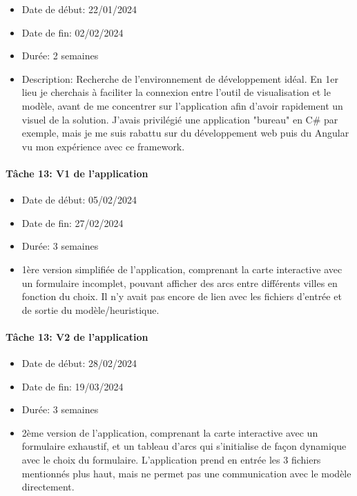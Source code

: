 \documentclass{polytech/polytech}
\numberwithin{figure}{chapter}
\begin{document}
\begin{appendix}
\begin{itemize}
    \item Date de début: 22/01/2024
    \item Date de fin: 02/02/2024
    \item Durée: 2 semaines
    \item
        Description: Recherche de l'environnement de développement idéal.
        En 1er lieu je cherchais à faciliter la connexion entre l'outil de visualisation et le modèle, avant de me concentrer sur l'application afin d'avoir rapidement un visuel de la solution. J'avais privilégié une application "bureau" en C\# par exemple, mais je me suis rabattu sur du développement web puis du Angular vu mon expérience avec ce framework.
\end{itemize}

\paragraph{Tâche 13: V1 de l'application}

\begin{itemize}
    \item Date de début: 05/02/2024
    \item Date de fin: 27/02/2024
    \item Durée: 3 semaines
    \item
        1ère version simplifiée de l'application, comprenant la carte interactive avec un formulaire incomplet, pouvant afficher des arcs entre différents villes en fonction du choix. Il n'y avait pas encore de lien avec les fichiers d'entrée et de sortie du modèle/heuristique. 
\end{itemize}

\paragraph{Tâche 13: V2 de l'application}

\begin{itemize}
    \item Date de début: 28/02/2024
    \item Date de fin: 19/03/2024
    \item Durée: 3 semaines
    \item
        2ème version de l'application, comprenant la carte interactive avec un formulaire exhaustif, et un tableau d'arcs qui s'initialise de façon dynamique avec le choix du formulaire. L'application prend en entrée les 3 fichiers mentionnés plus haut, mais ne permet pas une communication avec le modèle directement. 
\end{itemize}


\end{appendix}
\end{document}
